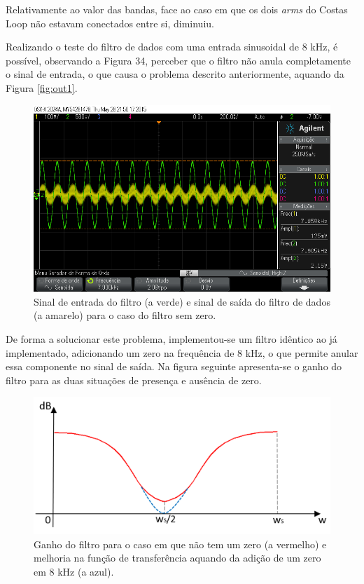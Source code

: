 \documentclass[11pt]{article}
\numberwithin{equation}{section}
\begin{document}
Relativamente ao valor das bandas, face ao caso em que os dois \textit{arms} do Costas Loop não estavam conectados entre si, diminuiu. 

Realizando o teste do filtro de dados com uma entrada sinusoidal de 8 kHz, é possível, observando a Figura 34, perceber que o filtro não anula completamente o sinal de entrada, o que causa o problema descrito anteriormente, aquando da Figura \ref{fig:out1}.

\begin{figure}[H]
	\centering
	\includegraphics[keepaspectratio=true, scale=0.37]{exps/FiltroSemZero8k}
	\caption{Sinal de entrada do filtro (a verde) e sinal de saída do filtro de dados (a amarelo) para o caso do filtro sem zero.}
	\vspace{-0.8em}
\end{figure} 

De forma a solucionar este problema, implementou-se um filtro idêntico ao já implementado, adicionando um zero na frequência de 8 kHz, o que permite anular essa componente no sinal de saída. Na figura seguinte apresenta-se o ganho do filtro para as duas situações de presença e ausência de zero.

\begin{figure}[H]
	\centering
	\includegraphics[keepaspectratio=true, scale=0.30]{teoricas/filtro1}
	\caption{Ganho do filtro para o caso em que não tem um zero (a vermelho) e melhoria na função de transferência aquando da adição de um zero em 8 kHz (a azul).}
	\vspace{-0.8em}
\end{figure} 
\end{document}
